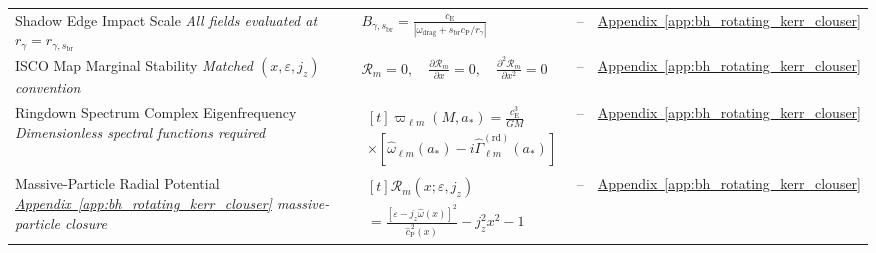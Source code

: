 \begin{longtable}{@{} p{4.5cm} p{6cm} c p{4cm} @{}}
{\raggedright Shadow Edge Impact Scale \newline \textit{All fields evaluated at $r_\gamma=r_{\gamma,s_{\mathrm{br}}}$}\par} & {\raggedright $B_{\gamma,s_{\mathrm{br}}}=\frac{c_{\mathrm E}}{|\omega_{\mathrm{drag}}+s_{\mathrm{br}}c_{\mathrm P}/r_\gamma|}$\par} & -- & {\raggedright \hyperref[app:bh_rotating_kerr_clouser]{Appendix~\ref*{app:bh_rotating_kerr_clouser}}\par} \\

{\raggedright ISCO Map Marginal Stability \newline \textit{Matched $(x,\varepsilon,j_z)$ convention}\par} & {\raggedright $\mathcal{R}_m = 0, \quad \frac{\partial\mathcal{R}_m}{\partial x} = 0, \quad \frac{\partial^2\mathcal{R}_m}{\partial x^2} = 0$\par} & -- & {\raggedright \hyperref[app:bh_rotating_kerr_clouser]{Appendix~\ref*{app:bh_rotating_kerr_clouser}}\par} \\

{\raggedright Ringdown Spectrum Complex Eigenfrequency \newline \textit{Dimensionless spectral functions required}\par} & {\raggedright $\begin{gathered}[t]\varpi_{\ell m}(M,a_*)=\frac{c_{\mathrm E}^3}{GM} \\ \times[\widehat\omega_{\ell m}(a_*)-i\widehat\Gamma_{\ell m}^{(\mathrm{rd})}(a_*)]\end{gathered}$\par} & -- & {\raggedright \hyperref[app:bh_rotating_kerr_clouser]{Appendix~\ref*{app:bh_rotating_kerr_clouser}}\par} \\

{\raggedright Massive-Particle Radial Potential \newline \textit{\hyperref[app:bh_rotating_kerr_clouser]{Appendix~\ref*{app:bh_rotating_kerr_clouser}} massive-particle closure}\par} & {\raggedright $\begin{gathered}[t]\mathcal R_m(x;\varepsilon,j_z) \\ =\frac{[\varepsilon-j_z\widehat\omega(x)]^2}{\widehat c_{\mathrm P}^{\,2}(x)}-j_z^2x^2-1\end{gathered}$\par} & -- & {\raggedright \hyperref[app:bh_rotating_kerr_clouser]{Appendix~\ref*{app:bh_rotating_kerr_clouser}}\par} \\


\end{longtable}

